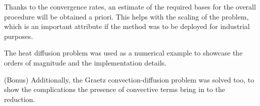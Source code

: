 \documentclass[../main.tex]{subfiles}
\begin{document}
Thanks to the convergence rates, an estimate of the required bases for the overall procedure will be obtained a priori.
This helps with the scaling of the problem, which is an important attribute if the method was to be deployed for industrial purposes. 

The heat diffusion problem was used as a numerical example to showcase the orders of magnitude and the implementation details. 

(Bonus) Additionally, the Graetz convection-diffusion problem was solved too, to show the complications the presence of convective terms bring in to the reduction. 
\printbibliography

\end{document}
